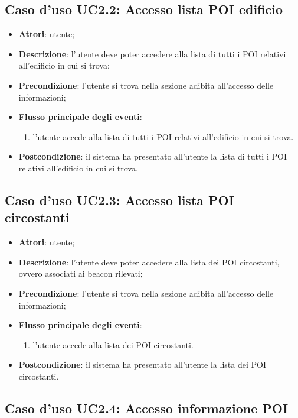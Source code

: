 \documentclass[../AnalisiDeiRequisiti.tex]{subfiles}
\begin{document}
\subsection{Caso d'uso UC2.2: Accesso lista POI edificio}
\begin{itemize}
	\item \textbf{Attori}: utente;
	\item \textbf{Descrizione}: l'utente deve poter accedere alla lista di tutti i POI relativi all'edificio in cui si trova; 
	\item \textbf{Precondizione}: l'utente si trova nella sezione adibita all'accesso delle informazioni;
	
	\item \textbf{Flusso principale degli eventi}:
	\begin{enumerate}
		\item l'utente accede alla lista di tutti i POI relativi all'edificio in cui si trova.
		
	\end{enumerate}
	\item \textbf{Postcondizione}: il sistema ha presentato all'utente la lista di tutti i POI relativi all'edificio in cui si trova.
\end{itemize}
\hypertarget{UC2.3}{}
\subsection{Caso d'uso UC2.3: Accesso lista POI circostanti}
\begin{itemize}
	\item \textbf{Attori}: utente;
	\item \textbf{Descrizione}: l'utente deve poter accedere alla lista dei POI circostanti, ovvero associati ai beacon rilevati; 
	\item \textbf{Precondizione}: l'utente si trova nella sezione adibita all'accesso delle informazioni;
	
	\item \textbf{Flusso principale degli eventi}:
	\begin{enumerate}
		\item l'utente accede alla lista dei POI circostanti.
		
	\end{enumerate}
	\item \textbf{Postcondizione}: il sistema ha presentato all'utente la lista dei POI circostanti.
\end{itemize}
\hypertarget{UC2.4}{}
\subsection{Caso d'uso UC2.4: Accesso informazione POI}
\end{document}
